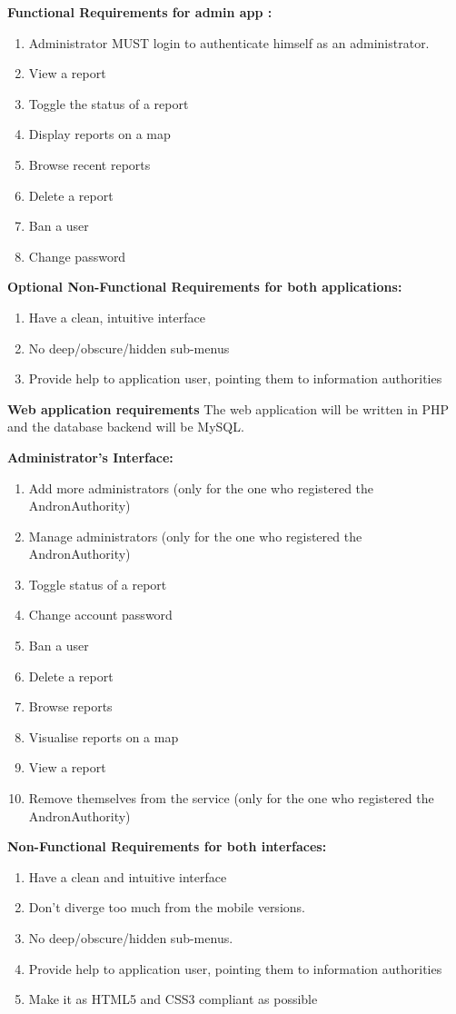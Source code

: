 \documentclass[12pt]{ecsproject}     %
\begin{document}
\textbf{Functional Requirements for admin app :}
\begin{enumerate}
\item  Administrator MUST login to authenticate himself as an administrator.
\item  View a report
\item  Toggle the status of a report
\item  Display reports on a map
\item Browse recent reports
\item Delete a report
\item Ban a user
\item Change password
\end{enumerate}

\textbf{Optional Non-Functional Requirements for both applications:}
\begin{enumerate}
\item Have a clean, intuitive interface
\item No deep/obscure/hidden sub-menus
\item Provide help to application user, pointing them to information authorities
\end{enumerate}

\textbf{Web application requirements}
The web application will be written in PHP and the database backend will be MySQL.

\textbf{Administrator's Interface:}
\begin{enumerate}

\item  Add more administrators (only for the one who registered the AndronAuthority)
\item Manage administrators (only for the one who registered the AndronAuthority)
\item Toggle status of a report
\item Change account password
\item Ban a user
\item Delete a report
\item Browse reports
\item Visualise reports on a map
\item  View a report
\item Remove themselves from the service  (only for the one who registered the AndronAuthority)
\end{enumerate}
\textbf{Non-Functional Requirements for both interfaces:}
\begin{enumerate}
\item Have a clean and intuitive interface
\item Don't diverge too much from the mobile versions.
\item No deep/obscure/hidden sub-menus.
\item Provide help to application user, pointing them to information authorities
\item Make it as HTML5 and CSS3 compliant as possible
\end{enumerate}
\end{document}
